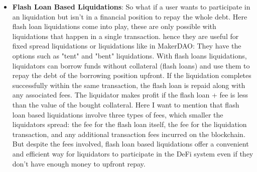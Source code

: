 \documentclass{article}
\begin{document}
\begin{itemize}
\item \textbf{Flash Loan Based Liquidations}: So what if a user wants to participate in an liquidation but isn't in a financial position to repay the whole debt. Here flash loan liquidations come into play, these are only possible with liquidations that happen in a single transaction. hence they are useful for fixed spread liquidations or liquidations like in MakerDAO: They have the options such as "tent" and "bent" liquidations. With flash loans liquidations, liquidators can borrow funds without collateral (flash loans) and use them to repay the debt of the borrowing position upfront. If the liquidation completes successfully within the same transaction, the flash loan is repaid along with any associated fees. The liquidator makes profit if the flash loan + fee is less than the value of the bought collateral. Here I want to mention that flash loan based liquidations involve three types of fees, which smaller the liquidators spread: the fee for the flash loan itself, the fee for the liquidation transaction, and any additional transaction fees incurred on the blockchain. But despite the fees involved, flash loan based liquidations offer a convenient and efficient way for liquidators to participate in the DeFi system even if they don't have enough money to upfront repay.

\end{itemize}
\end{document}
